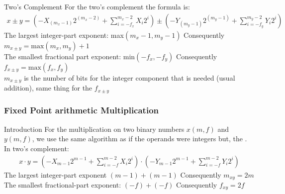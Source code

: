 \begin{parag}{Two's Complement}
    For the two's complement the formula is:
    \begin{align*}
        x \pm y = \left( -X_{(m_x - 1)}2^{(m_x - 2)} + \sum_{i = -f_x}^{m_x - 2} X_i2^i \right ) \pm \left( -Y_{(m_y-1)}2^{(m_y - 1)} + \sum_{i=-f_y}^{m_y - 2} Y_i 2^i \right)
    \end{align*}
    The largest integer-part exponent: max$(m_x - 1, m_y - 1)$ Consequently $m_{ x \pm y} = \text{max}(m_x, m_y) + 1$\\
    The smallest fractional part exponent: min$(-f_x, -f_y)$ Consequently $f_{x \pm y} = \text{max}(f_x, f_y)$
    \\
    $m_{x \pm y}$ is the number of bits for the integer component that is needed (usual addition), same thing for the $f_{x \pm y}$

\end{parag}


\subsubsection{Fixed Point arithmetic Multiplication}

\begin{parag}{Introduction}
For the multiplication on two binary numbers $x(m, f)$ and $y(m, f)$, we use the same algorithm as if the operands were integers but, the . 
\\
In two's complement:
\begin{align*}
    x \cdot y = \left(-X_{m-1} 2^{m-1} + \sum_{i = -f}^{m-2} X_i2^i \right) \cdot \left( -Y_{m-1}2^{m-1} + \sum_{i = -f}^{m-2} Y_i2^i \right)
\end{align*}
The largest integer-part exponent $(m-1) + (m-1)$ Consequently $m_{xy} = 2m$ \\
The smallest fractional-part exponent: $(-f) + (-f)$ Consequently $f_{xy} = 2f$ 

\end{parag}

